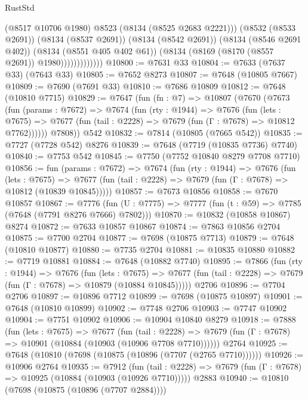 \begin{lexlean}{RustStd}
\begin{coremodule}
                            (@8517 @10706 @1980)
                            @8523
                            (@8134 (@8525 @2683 @2221)))
                          (@8532 (@8533 @2691))
                          (@8134 (@8537 @2691))
                          (@8134 (@8542 @2691))
                          (@8134 (@8546 @2691 @402))
                          (@8134 (@8551 @405 @402 @61))
                          (@8134 (@8169 (@8170 (@8557 @2691)) @1980)))))))))))))
@10800 := @7631 @33
@10804 := @7633 (@7637 @33) (@7643 @33)
@10805 := @7652 @8273
@10807 := @7648 (@10805 @7667)
@10809 := @7690 (@7691 @33)
@10810 := @7686 @10809
@10812 := @7648 (@10810 @7715)
@10829 := @7647
    (fun (fn : @7) =>
    @10807
      (@7670
        (@7673
          (fun (params : @7672) =>
          @7674
            (fun (rty : @1944) =>
            @7676
              (fun (lets : @7675) =>
              @7677 (fun (tail : @2228) => @7679 (fun (Γ : @7678) => @10812 @7762))))))
        @7808))
    @542
@10832 := @7814 (@10805 (@7665 @542))
@10835 := @7727 (@7728 @542) @8276
@10839 := @7648 (@7719 (@10835 @7736) @7740)
@10840 := @7753 @542
@10845 := @7750 (@7752 @10840 @8279 @7708 @7710)
@10856 := fun (params : @7672) =>
  @7674
    (fun (rty : @1944) =>
    @7676
      (fun (lets : @7675) =>
      @7677 (fun (tail : @2228) => @7679 (fun (Γ : @7678) => @10812 (@10839 @10845)))))
@10857 := @7673 @10856
@10858 := @7670 @10857
@10867 := @7776
    (fun (U : @7775) => @7777 (fun (t : @59) => @7785 (@7648 (@7791 @8276 @7666) @7802)))
@10870 := @10832 (@10858 @10867) @8274
@10872 := @7633 @10857 @10867
@10874 := @7863 @10856 @2704
@10875 := @7700 @2704
@10877 := @7698 (@10875 @7713)
@10879 := @7648 (@10810 @10877)
@10880 := @7735 @2704
@10881 := @10835 @10880
@10882 := @7719 @10881
@10884 := @7648 (@10882 @7740)
@10895 := @7866
    (fun (rty : @1944) =>
    @7676
      (fun (lets : @7675) =>
      @7677 (fun (tail : @2228) => @7679 (fun (Γ : @7678) => @10879 (@10884 @10845)))))
    @2706
@10896 := @7704 @2706
@10897 := @10896 @7712
@10899 := @7698 (@10875 @10897)
@10901 := @7648 (@10810 @10899)
@10902 := @7748 @2706
@10903 := @7747 @10902
@10904 := @7751 @10902
@10906 := @10904 @10840 @8279
@10918 := @7888
    (fun (lets : @7675) =>
    @7677
      (fun (tail : @2228) =>
      @7679 (fun (Γ : @7678) => @10901 (@10884 (@10903 (@10906 @7708 @7710))))))
    @2764
@10925 := @7648 (@10810 (@7698 (@10875 (@10896 (@7707 (@2765 @7710))))))
@10926 := @10906 @2764
@10935 := @7912
    (fun (tail : @2228) => @7679 (fun (Γ : @7678) => @10925 (@10884 (@10903 (@10926 @7710)))))
    @2883
@10940 := @10810 (@7698 (@10875 (@10896 (@7707 @2884))))

\end{coremodule}
\end{lexlean}
